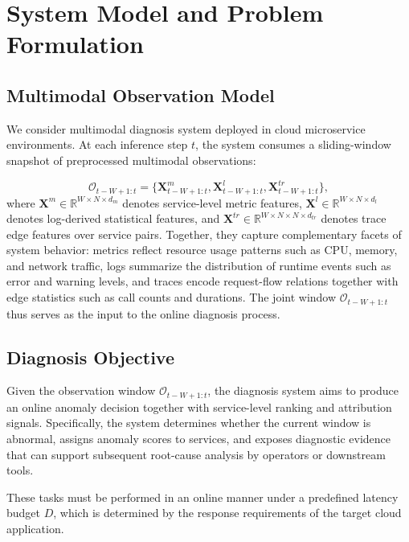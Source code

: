 \section{System Model and Problem Formulation}

\subsection{Multimodal Observation Model}

We consider  multimodal diagnosis system deployed in cloud microservice environments. At each inference step \(t\), the system consumes a sliding-window snapshot of preprocessed multimodal observations:

\begin{equation}
\mathcal{O}_{t-W+1:t} =
\{\mathbf{X}^{m}_{t-W+1:t}, \mathbf{X}^{l}_{t-W+1:t}, \mathbf{X}^{tr}_{t-W+1:t}\},
\end{equation}
where \(\mathbf{X}^{m}\in\mathbb{R}^{W\times N\times d_m}\) denotes service-level metric features, \(\mathbf{X}^{l}\in\mathbb{R}^{W\times N\times d_l}\) denotes log-derived statistical features, and \(\mathbf{X}^{tr}\in\mathbb{R}^{W\times N\times N\times d_{tr}}\) denotes trace edge features over service pairs. Together, they capture complementary facets of system behavior: metrics reflect resource usage patterns such as CPU, memory, and network traffic, logs summarize the distribution of runtime events such as error and warning levels, and traces encode request-flow relations together with edge statistics such as call counts and durations. The joint window \(\mathcal{O}_{t-W+1:t}\) thus serves as the input to the online diagnosis process.

\subsection{Diagnosis Objective}

Given the observation window \(\mathcal{O}_{t-W+1:t}\), the diagnosis system aims to produce an online anomaly decision together with service-level ranking and attribution signals. Specifically, the system determines whether the current window is abnormal, assigns anomaly scores to services, and exposes diagnostic evidence that can support subsequent root-cause analysis by operators or downstream tools.

These tasks must be performed in an online manner under a predefined latency budget $D$, which is determined by the response requirements of the target cloud application. 
